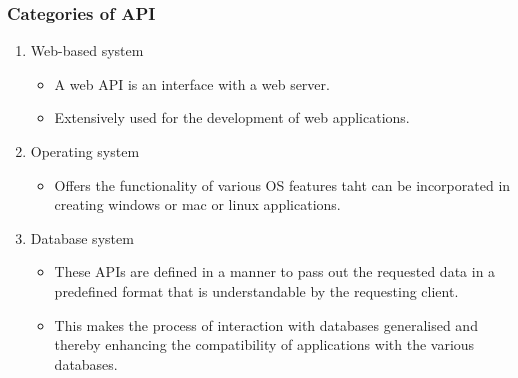 \documentclass[aspectratio=169]{beamer}
\begin{document}
\begin{frame}
    \frametitle{Categories of API}
    \begin{enumerate}
        \item Web-based system
        \begin{itemize}
            \item A web API is an interface with a web server.
            \item Extensively used for the development of web applications.
        \end{itemize}
        \item Operating system
        \begin{itemize}
            \item Offers the functionality of various OS features taht can be incorporated in creating windows or mac or linux applications.
        \end{itemize}
        \item Database system
        \begin{itemize}
            \item These APIs are defined in a manner to pass out the requested data in a predefined format that is understandable by the requesting client.
            \item This makes the process of interaction with databases generalised and thereby enhancing the compatibility of applications with the various databases.
        \end{itemize}
    \end{enumerate}
\end{frame}
\end{document}
